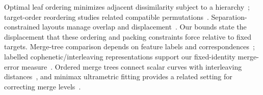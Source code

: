Optimal leaf ordering minimizes adjacent dissimilarity subject to a hierarchy~\cite{BarJoseph:2001:OLO}; target-order reordering studies related compatible permutations~\cite{Bulteau:2022:RT}. Separation-constrained layouts manage overlap and displacement~\cite{Dwyer:2006:IPSEP,Li:2019:SOI}. Our bounds state the displacement that these ordering and packing constraints force relative to fixed targets. Merge-tree comparison depends on feature labels and correspondences~\cite{Yan:2021:Survey}; labelled cophenetic/interleaving representations support our fixed-identity merge-error measure~\cite{Munch:2019:LINF,Gasparovic:2024:IID}. Ordered merge trees connect scalar curves with interleaving distances~\cite{Beurskens:2025:OMT}, and minimax ultrametric fitting provides a related setting for correcting merge levels~\cite{Farach:1995:RM}.
